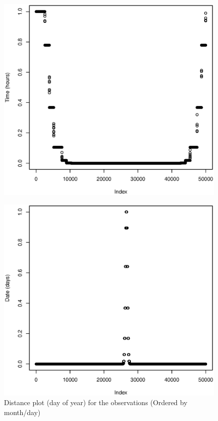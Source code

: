 \documentclass[a4paper, 12pt]{article}
\begin{document}
\begin{figure}[H]
\begin{minipage}[]{0.2\textwidth}
	    \end{minipage}
	    \begin{minipage}[]{0.4\textwidth}
	    	\includegraphics[width=\textwidth]{share/11_time.eps}
	    \end{minipage}
    \end{figure}

    \begin{figure}[H]
    \centering
    \caption{Distance plot (day of year) for the observations (Ordered by month/day)\label{fig:day}}
	    \begin{minipage}[]{0.4\textwidth}
	    	\includegraphics[width=\textwidth]{share/1_date.eps}
	    \end{minipage}
    \end{figure}
\end{document}
